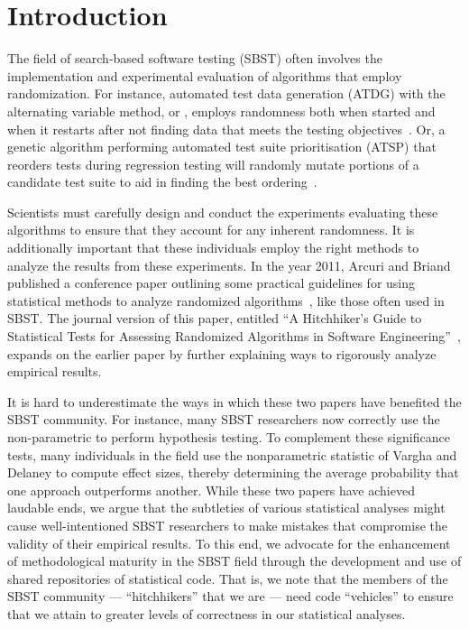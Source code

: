 
\section{Introduction}
\label{sec:introduction}

The field of search-based software testing (SBST) often involves the implementation and experimental evaluation of
algorithms that employ randomization. For instance, automated test data generation (ATDG) with the alternating variable
method, or \AVM, employs randomness both when started and when it restarts after not finding data that meets the testing
objectives~\cite{McMinn2015}. Or, a genetic algorithm performing automated test suite prioritisation (ATSP) that
reorders tests during regression testing will randomly mutate portions of a candidate test suite to aid in finding the
best ordering~\cite{Walcott2006}.

Scientists must carefully design and conduct the experiments evaluating these algorithms to ensure that they account for
any inherent randomness. It is additionally important that these individuals employ the right methods to analyze the
results from these experiments. In the year 2011, Arcuri and Briand published a conference paper outlining some
practical guidelines for using statistical methods to analyze randomized algorithms~\cite{Arcuri2011}, like those often
used in SBST. The journal version of this paper, entitled ``A Hitchhiker's Guide to Statistical Tests for Assessing
Randomized Algorithms in Software Engineering''~\cite{Arcuri2014}, expands on the earlier paper by further explaining
ways to rigorously analyze empirical results.

It is hard to underestimate the ways in which these two papers have benefited the SBST community. For instance, many
SBST researchers now correctly use the non-parametric \wilcoxon to perform hypothesis testing. To complement these
significance tests, many individuals in the field use the nonparametric \atwelve statistic of Vargha and Delaney
\cite{Vargha2000} to compute effect sizes, thereby determining the average probability that one approach outperforms
another. While these two papers have achieved laudable ends, we argue that the subtleties of various statistical
analyses might cause well-intentioned SBST researchers to make mistakes that compromise the validity of their empirical
results. To this end, we advocate for the enhancement of methodological maturity in the SBST field through the development
and use of shared repositories of statistical code. That is, we note that the members of the SBST community ---
``hitchhikers'' that we are --- need code ``vehicles'' to ensure that we attain to greater levels of correctness in our
statistical analyses.

